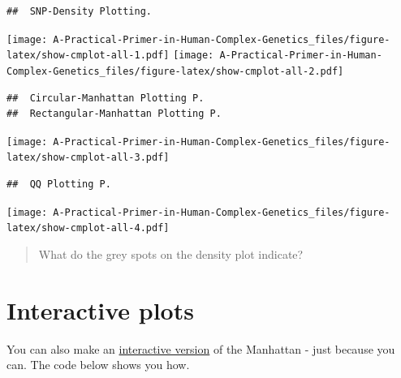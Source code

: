 \documentclass[
]{book}
\begin{document}
\begin{verbatim}
##  SNP-Density Plotting.
\end{verbatim}

\texttt{[image: A-Practical-Primer-in-Human-Complex-Genetics\_files/figure-latex/show-cmplot-all-1.pdf]} \texttt{[image: A-Practical-Primer-in-Human-Complex-Genetics\_files/figure-latex/show-cmplot-all-2.pdf]}

\begin{verbatim}
##  Circular-Manhattan Plotting P.
##  Rectangular-Manhattan Plotting P.
\end{verbatim}

\texttt{[image: A-Practical-Primer-in-Human-Complex-Genetics\_files/figure-latex/show-cmplot-all-3.pdf]}

\begin{verbatim}
##  QQ Plotting P.
\end{verbatim}

\texttt{[image: A-Practical-Primer-in-Human-Complex-Genetics\_files/figure-latex/show-cmplot-all-4.pdf]}

\begin{quote}
What do the grey spots on the density plot indicate?
\end{quote}

\hypertarget{interactive-plots}{%
\section{Interactive plots}\label{interactive-plots}}

You can also make an \href{https://r-graph-gallery.com/101_Manhattan_plot.html}{interactive version} of the Manhattan - just because you can. The code below shows you how.
\end{document}
